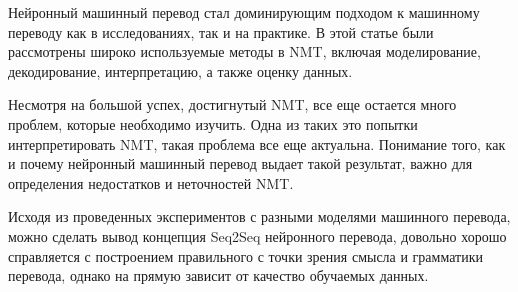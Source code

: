 \documentclass[a4paper,12pt]{article}
\begin{document}
    Нейронный машинный перевод стал доминирующим подходом к машинному переводу как в исследованиях, так и на практике. В этой статье были рассмотрены широко используемые методы в NMT, включая моделирование, декодирование, интерпретацию, а также оценку данных. 
    
    Несмотря на большой успех, достигнутый NMT, все еще остается много проблем, которые необходимо изучить. Одна из таких это попытки интерпретировать NMT, такая проблема все еще актуальна. Понимание того, как и почему нейронный машинный перевод выдает такой результат, важно для определения недостатков и неточностей NMT.
    
    Исходя из проведенных экспериментов с разными моделями машинного перевода, можно сделать вывод концепция Seq2Seq нейронного перевода, довольно хорошо справляется с построением правильного с точки зрения смысла и грамматики перевода, однако на прямую зависит от качество обучаемых данных.
    
	\clearpage
	
	
\end{document}

